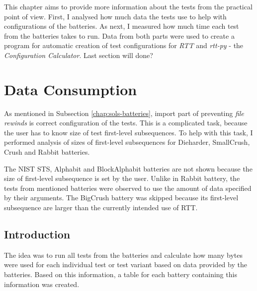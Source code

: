 \documentclass[
  digital,     %
  oneside,     %
  nosansbold,  %
  nocolorbold, %
  nolof,         %
  nolot,         %
]{fithesis4}
\begin{document}
This chapter aims to provide more information about the tests from the practical point of view. First, I analysed how much data the tests use to help with configurations of the batteries. As next, I measured how much time each test from the batteries takes to run. Data from both parts were used to create a program for automatic creation of test configurations for \emph{RTT} and \emph{rtt-py} - the \emph{Configuration Calculator}. Last section will done? %




\section{Data Consumption} \label{chap:analysis-data}


As mentioned in Subsection \ref{chap:sols-batteries}, import part of preventing \emph{file rewinds} is correct configuration of the tests. This is a complicated task, because the user has to know size of test first-level subsequences. To help with this task, I performed analysis of sizes of first-level subsequences for Dieharder, SmallCrush, Crush and Rabbit batteries.  %

The NIST STS, Alphabit and BlockAlphabit batteries are not shown because the size of first-level subsequence is set by the user. Unlike in Rabbit battery, the tests from mentioned batteries were observed to use the amount of data specified by their arguments. The BigCrush battery was skipped because its first-level subsequence are larger than the currently intended use of RTT.


\subsection{Introduction} \label{chap:analysis-data-intro}

The idea was to run all tests from the batteries and calculate how many bytes were used for each individual test or test variant based on data provided by the batteries. Based on this information, a table for each battery containing this information was created.
\end{document}
